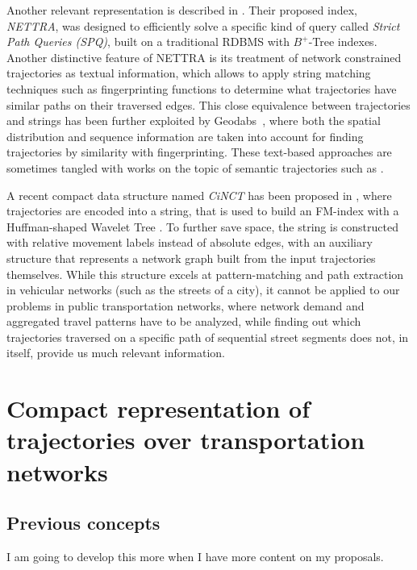 \documentclass[a4paper,10pt,twoside]{book}
\begin{document}
    Another relevant representation is described in \cite{DBLP:conf/gis/KroghPTT14}. Their proposed index, {\em NETTRA}, was designed to efficiently solve a specific kind of query called {\em Strict Path Queries (SPQ)}, built on a traditional RDBMS with $B^+$-Tree indexes. Another distinctive feature of NETTRA is its treatment of network constrained trajectories as textual information, which allows to apply string matching techniques such as fingerprinting functions to determine what trajectories have similar paths on their traversed edges. This close equivalence between trajectories and strings has been further exploited by Geodabs~\cite{chapuis2018geodabs}, where both the spatial distribution and sequence information are taken into account for finding trajectories by similarity with fingerprinting. These text-based approaches are sometimes tangled with works on the topic of semantic trajectories such as \cite{al2017semantictraj}.
    
    
    A recent compact data structure named {\em CiNCT} has been proposed in \cite{koide2018cinct}, where trajectories are encoded into a string, that is used to build an FM-index \cite{DBLP:conf/focs/FerraginaM00} with a Huffman-shaped Wavelet Tree \cite{ferragina2009compressed}. To further save space, the string is constructed with relative movement labels instead of absolute edges, with an auxiliary structure that represents a network graph built from the input trajectories themselves. While this structure excels at pattern-matching and path extraction in vehicular networks (such as the streets of a city), it cannot be applied to our problems in public transportation networks, where network demand and aggregated travel patterns have to be analyzed, while finding out which trajectories traversed on a specific path of sequential street segments does not, in itself, provide us much relevant information.
	
	
\part{Compact representation of trajectories over transportation networks}
\chapter{Previous concepts}
	I am going to develop this more when I have more content on my proposals.
	
\end{document}

